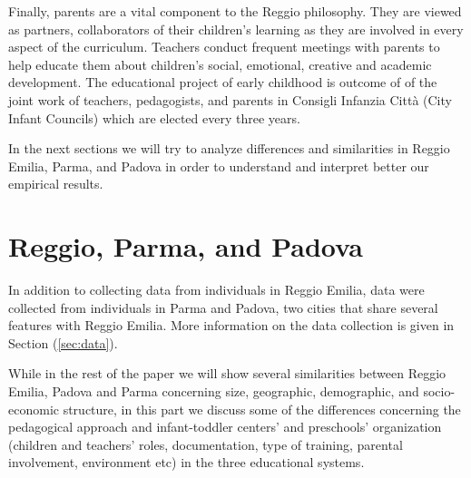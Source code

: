 \documentclass[12pt]{article}
\begin{document}
Finally, parents are a vital component to the Reggio philosophy. They are
viewed as partners, collaborators of their children's learning as they are
involved in every aspect of the curriculum. Teachers conduct frequent
meetings with parents to help educate them about children's social,
emotional, creative and academic development. The educational project of
early childhood is outcome of of the joint work of teachers, pedagogists,
and parents in Consigli Infanzia Citt\`{a} (City Infant Councils) which are
elected every three years.

In the next sections we will try to analyze differences and similarities in
Reggio Emilia, Parma, and Padova in order to understand and interpret better
our empirical results.

\section{Reggio, Parma, and Padova}

\label{sec:ParmaPadova}

In addition to collecting data from individuals in Reggio Emilia, data were
collected from individuals in Parma and Padova, two cities that share
several features with Reggio Emilia. 
More information on the data collection is given in Section (\ref{sec:data}).

While in the rest of the paper we will show several similarities between
Reggio Emilia, Padova and Parma concerning size, geographic, demographic,
and socio-economic structure, in this part we discuss some of the
differences concerning the pedagogical approach and infant-toddler centers'
and preschools' organization (children and teachers' roles, documentation,
type of training, parental involvement, environment etc) in the three
educational systems.

\end{document}

